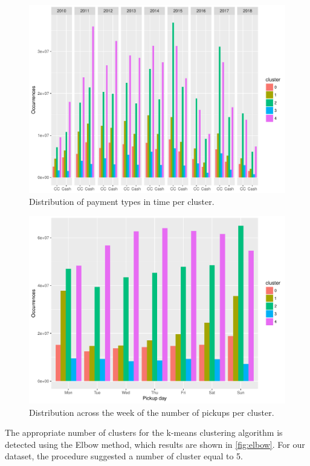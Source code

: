 \documentclass{acm_proc_article-sp-sigmod09}
\begin{document}
\begin{figure}
	\centering
	\includegraphics[width=1\columnwidth]{resources/clustered_plots/payment_type_distr.pdf}
	\caption{Distribution of payment types in time per cluster.}
	\label{fig:clusterPaymentType}
\end{figure}

\begin{figure}
	\centering
	\includegraphics[width=1\columnwidth]{resources/clustered_plots/pickup_weekday_dist.pdf}
	\caption{Distribution across the week of the number of pickups per cluster.}
	\label{fig:clusterPickupDay}
\end{figure}


The appropriate number of clusters for the k-means clustering algorithm is detected using the Elbow method, which results are shown in \cref{fig:elbow}. For our dataset, the procedure suggested a number of cluster equal to 5. 
\end{document}
